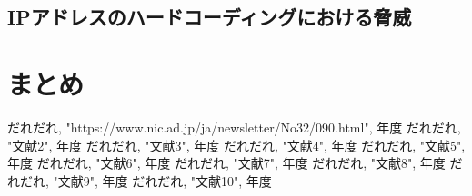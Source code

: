 \documentclass[a4j]{jarticle}
\begin{document}
\subsection{IPアドレスのハードコーディングにおける脅威}

\newpage
\section{まとめ}

\newpage
\begin{thebibliography}{99}
だれだれ, "https://www.nic.ad.jp/ja/newsletter/No32/090.html", 年度
だれだれ, "文献2", 年度
だれだれ, "文献3", 年度
だれだれ, "文献4", 年度
だれだれ, "文献5", 年度
だれだれ, "文献6", 年度
だれだれ, "文献7", 年度
だれだれ, "文献8", 年度
だれだれ, "文献9", 年度
だれだれ, "文献10", 年度

\end{thebibliography}
\end{document}
